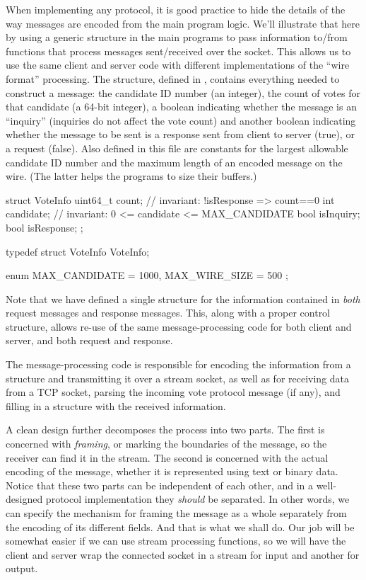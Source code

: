 When implementing any protocol, it is good practice
to hide the details of the way messages are encoded from the main
program logic.
% 
We'll illustrate that here by using a generic structure in the main
programs to pass
information to/from functions that process messages sent/received over
the socket. 
%
This allows us to use the same client and server code with different
implementations of the ``wire format'' processing.
%
The  structure, defined in ,
contains everything needed to construct a message: the candidate ID number (an
integer), the count of votes for that candidate (a 64-bit integer),
a boolean indicating whether the message is an ``inquiry'' (inquiries do
not affect the vote count) and another boolean indicating whether the
message to be sent is a response sent from client to server (true), or
a request (false). 
%
Also defined in this file are constants for the largest allowable
candidate ID number and the maximum length of an encoded message on
the wire.  (The latter helps the programs to size their buffers.)
%
\begin{inlinecode}
struct VoteInfo {
  uint64_t count;   // invariant: !isResponse => count==0
  int candidate;    // invariant: 0 <= candidate <= MAX_CANDIDATE
  bool isInquiry;
  bool isResponse;
};

typedef struct VoteInfo VoteInfo;

enum {
    MAX_CANDIDATE = 1000,
    MAX_WIRE_SIZE = 500
};
\end{inlinecode}
Note that we have defined a single  structure for
the information contained in \emph{both\/} request messages and
response messages. 
This, along with a proper control structure, allows re-use of the same
message-processing code for both client and server, and both
request and response.

The message-processing code is responsible for encoding the
information from a  structure and transmitting it over a
stream socket, as well as for receiving data from a TCP socket,
parsing the incoming vote protocol message (if any), and filling in a
 structure with the received information.

A clean design further decomposes the process into two parts.
The first is concerned with \emph{framing}, or marking the boundaries
of the message, so the receiver can find it in the stream.
The second is concerned with the actual encoding of the message,
whether it is represented using text or binary data.
%
Notice that these two parts can be independent of each other, and in a
well-designed protocol implementation they \emph{should\/} be separated.
In other words, we can specify the
mechanism for framing the message as a whole separately from the
encoding of its different fields.  And that is what we shall do.
%
Our job will be somewhat easier if we can use stream
processing functions, so we will have the client and server
wrap the connected socket in a  stream for input and
another for output. 

